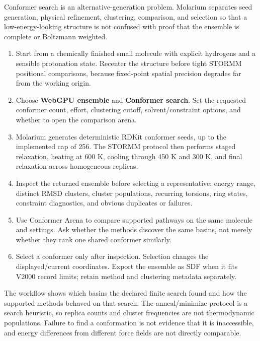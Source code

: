 
Conformer search is an alternative-generation problem. Molarium separates seed generation, physical refinement, clustering, comparison, and selection so that a low-energy-looking structure is not confused with proof that the ensemble is complete or Boltzmann weighted.


\begin{enumerate}
\item Start from a chemically finished small molecule with explicit hydrogens and a sensible protonation state. Recenter the structure before tight STORMM positional comparisons, because fixed-point spatial precision degrades far from the working origin.
\item Choose \textbf{WebGPU ensemble} and \textbf{Conformer search}. Set the requested conformer count, effort, clustering cutoff, solvent/constraint options, and whether to open the comparison arena.
\item Molarium generates deterministic RDKit conformer seeds, up to the implemented cap of 256. The STORMM protocol then performs staged relaxation, heating at 600 K, cooling through 450 K and 300 K, and final relaxation across homogeneous replicas.
\item Inspect the returned ensemble before selecting a representative: energy range, distinct RMSD clusters, cluster populations, recurring torsions, ring states, constraint diagnostics, and obvious duplicates or failures.
\item Use Conformer Arena to compare supported pathways on the same molecule and settings. Ask whether the methods discover the same basins, not merely whether they rank one shared conformer similarly.
\item Select a conformer only after inspection. Selection changes the displayed/current coordinates. Export the ensemble as SDF when it fits V2000 record limits; retain method and clustering metadata separately.
\end{enumerate}


The workflow shows which basins the declared finite search found and how the supported methods behaved on that search. The anneal/minimize protocol is a search heuristic, so replica counts and cluster frequencies are not thermodynamic populations. Failure to find a conformation is not evidence that it is inaccessible, and energy differences from different force fields are not directly comparable.

